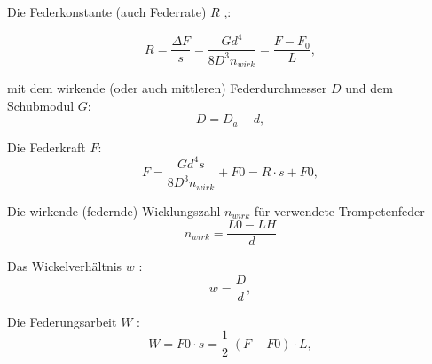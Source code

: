 Die Federkonstante (auch Federrate) $R$ \cite{schnöringfedern},\cite{Federrate}:

\begin{equation}
    R=\frac{\Delta F}{s}=\frac{Gd^4}{8D^3n_{wirk}}=\frac{F-F_0}{L},
    \label{eqn:federrate}
\end{equation}

mit dem wirkende (oder auch mittleren) Federdurchmesser $D$ und dem Schubmodul $G$:
\begin{equation}
    D=D_a-d,
\end{equation}

Die Federkraft $F$:
\begin{equation}
    F=\frac{Gd^4s}{8D^3n_{wirk}}+F0=R \cdot s +F0,
    \label{eqn:federkraft}
\end{equation}

Die wirkende (federnde) Wicklungszahl $n_{wirk}$ für verwendete Trompetenfeder
\begin{equation}
    n_{wirk}=\frac{L0-LH}{d}    
\end{equation}

Das Wickelverhältnis $w$ \cite[37]{schnöringfedern}:
\begin{equation}
    w=\frac{D}{d},
\end{equation}

Die Federungsarbeit $W$ \cite[37]{schnöringfedern}:
\begin{equation}
    W=F0 \cdot s = \frac{1}{2}\;(F-F0) \cdot L,
    \label{eqn:federungsarbeit}
\end{equation}
\newline







